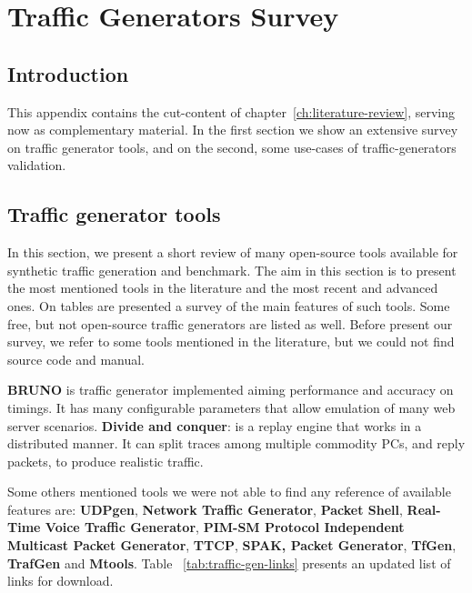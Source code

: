 \chapter{Traffic Generators Survey}\label{ap:traffic-gen-survey}

\section{Introduction}

This appendix contains the cut-content of chapter~\ref{ch:literature-review}, serving now as complementary material. In the first section we show an extensive survey on traffic generator tools, and on the second, some use-cases of traffic-generators validation.


\section{Traffic generator tools}


In this section, we present a short review of many open-source tools available for synthetic traffic generation and benchmark. The aim in this section is to present the most mentioned tools in the literature and the most recent and advanced ones. On tables are presented a survey of the main features of such tools. Some free, but not open-source traffic generators are listed as well. Before present our survey, we refer to some tools mentioned in the literature, but we could not find source code and manual. 

\textbf{BRUNO}\cite{bruno-paper} is traffic generator implemented aiming performance and accuracy on timings. It has many configurable parameters that allow emulation of many web server scenarios. \textbf{Divide and conquer}\cite{validate-trafficgen}: is a replay engine that works in a distributed manner. It can split traces among multiple commodity PCs, and reply packets, to produce realistic traffic. 

Some others mentioned tools \cite{web-ditg} we were not able to find any reference of available features are: \textbf{UDPgen}, \textbf{Network Traffic Generator}, \textbf{Packet Shell}, \textbf{Real-Time Voice Traffic Generator}, \textbf{PIM-SM Protocol Independent Multicast Packet Generator}, \textbf{TTCP}, \textbf{SPAK, Packet Generator}, \textbf{TfGen}, \textbf{TrafGen} and \textbf{Mtools}. Table ~\ref{tab:traffic-gen-links} presents an updated list of links for download.


